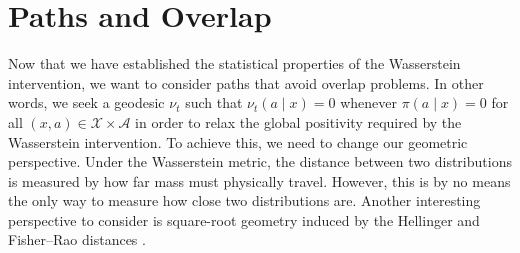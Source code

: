 \documentclass[11pt,twoside]{article}
\theoremstyle{definition}
\theoremstyle{remark}
\begin{document}
\section{Paths and Overlap} \label{hellinger_section}


Now that we have established the statistical properties of the Wasserstein intervention, we want to consider paths that avoid overlap problems. In other words, we seek a geodesic $\nu_t$ such that $\nu_t(a \! \mid \! x) = 0$ whenever $\pi(a \! \mid \! x) = 0$ for all $(x, a) \in \mathcal{X} \times \mathcal{A}$ in order to relax the global positivity required by the Wasserstein intervention. To achieve this, we need to change our geometric perspective. Under the Wasserstein metric, the distance between two distributions is measured by how far mass must physically travel. However, this is by no means the only way to measure how close two distributions are. Another interesting perspective to consider is square-root geometry induced by the Hellinger and Fisher--Rao distances \citep{Hellinger1909, amari2016information}.
\end{document}
